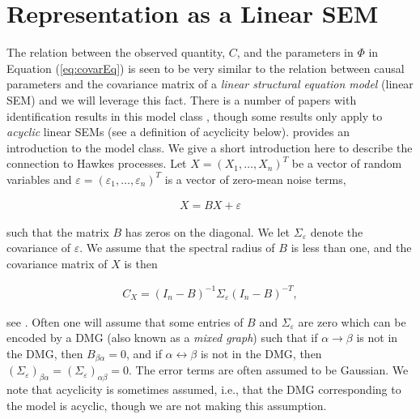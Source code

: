 \documentclass[accepted]{uai2021} %
\begin{document}

\section{Representation as a Linear SEM}

The relation between the observed quantity, $C$, and the parameters in $\Phi$ 
in 
Equation (\ref{eq:covarEq}) is seen to be very similar to the relation between 
causal parameters and the covariance matrix of a \emph{linear structural 
	equation model} (linear SEM) and we will leverage this fact. 
There is 
a number of papers with 
identification results in this model class \citep{brito2002, tian2007, 
	tian2009, 
	foygelHalftrek2012, 
	chenNIPS2016, drton2016, 
	weihs2018}, though some results only apply to \emph{acyclic} linear SEMs 
	(see a 
definition of acyclicity below). \cite{bollen1989} provides an introduction to 
the model class. We give a short introduction here to describe the connection 
to 
Hawkes processes. Let $X = (X_1,\ldots,X_n)^T$ be a vector of random variables 
and 
$\varepsilon = 
(\varepsilon_1,\ldots,\varepsilon_n)^T$ is a vector of zero-mean noise terms,

\begin{align}
X = BX + \varepsilon
\label{eq:SEM}
\end{align}

such that the matrix $B$ has zeros on the diagonal. We let $\Sigma_\varepsilon$ 
denote the covariance of $\varepsilon$. We assume that the spectral radius of 
$B$ is less than one, and the
covariance matrix of $X$ is then

\begin{align}
C_X = (I_n - B)^{-1}\Sigma_\varepsilon (I_n - B)^{-T},
\label{eq:covSEM}
\end{align}

see \cite{hyttinen2012}. Often one will assume that some entries of $B$ and 
$\Sigma_\varepsilon$ are zero which can be encoded by a DMG (also known as a 
\emph{mixed graph}) such that if 
$\alpha \rightarrow \beta$ is not in the DMG, then $B_{\beta\alpha} = 0$, and 
if
$\alpha\leftrightarrow\beta$ is not in the DMG, then 
$(\Sigma_\varepsilon)_{\beta\alpha} = (\Sigma_\varepsilon)_{\alpha\beta} = 0$. 
The 
error terms are often assumed to be Gaussian. We note that acyclicity is 
sometimes assumed, 
i.e., that the DMG corresponding to the model is 
acyclic, though we are not making 
this assumption.
\end{document}
